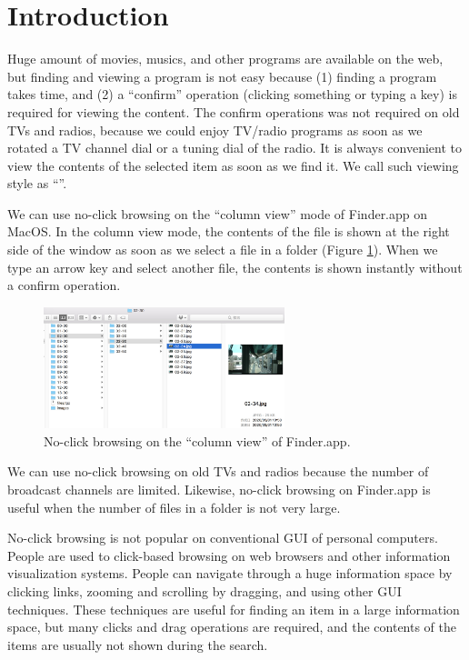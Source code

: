 \documentclass[conference]{IEEEtran}
\begin{document}

\section{Introduction}

% 

Huge amount of movies, musics, and other programs are available on the web, but
finding and viewing a program is not easy because
(1) finding a program takes time, and
(2) a ``confirm'' operation (clicking something or typing a key)
is required for viewing the content.
%
The confirm operations was not required on old TVs and radios,
because we could enjoy TV/radio programs
as soon as we rotated a TV channel dial or a tuning dial of the radio.
%
It is always convenient to view the contents of the selected item
as soon as we find it.
We call such viewing style as ``\textbf{}''.

We can use no-click browsing on the ``column view'' mode of Finder.app on MacOS.
In the column view mode, 
the contents of the file is shown at the right side of the window
as soon as we select a file in a folder (Figure \ref{noclickfinder}).
When we type an arrow key and select another file,
the contents is shown instantly without a confirm operation.

\begin{figure}[H]
  \centerline{\includegraphics[width=70mm,bb=0 0 839 423]{figures/10d7ca6c55aa93ebcdab799246e4c087.jpg}}
  \caption{No-click browsing on the ``column view'' of Finder.app.}
  \label{noclickfinder}
\end{figure}

We can use no-click browsing on old TVs and radios because the number of
broadcast channels are limited.
Likewise, no-click browsing on Finder.app is useful
when the number of files in a folder is not very large.

No-click browsing is not popular on conventional GUI of personal computers.
People are used to click-based browsing on web browsers and other
information visualization systems.
People can navigate through a huge information space by
clicking links, zooming and scrolling by dragging, and using other GUI techniques.
These techniques are useful for finding an item in a large information space,
but many clicks and drag operations are required,
and the contents of the items are usually not shown during the search.
\end{document}
